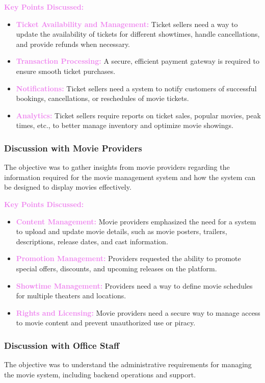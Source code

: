 \documentclass[a4paper,12pt]{article}  %
\renewcommand{\textbf}[1]{\textcolor{violet}{\bfseries #1}}
\begin{document}
\textbf{Key Points Discussed:}
\begin{itemize}
    \item \textbf{Ticket Availability and Management:} Ticket sellers need a way to update the availability of tickets for different showtimes, handle cancellations, and provide refunds when necessary.
    \item \textbf{Transaction Processing:} A secure, efficient payment gateway is required to ensure smooth ticket purchases.
    \item \textbf{Notifications:} Ticket sellers need a system to notify customers of successful bookings, cancellations, or reschedules of movie tickets.
    \item \textbf{Analytics:} Ticket sellers require reports on ticket sales, popular movies, peak times, etc., to better manage inventory and optimize movie showings.
\end{itemize}

\subsubsection*{Discussion with Movie Providers}
The objective was to gather insights from movie providers regarding the information required for the movie management system and how the system can be designed to display movies effectively.

\textbf{Key Points Discussed:}
\begin{itemize}
    \item \textbf{Content Management:} Movie providers emphasized the need for a system to upload and update movie details, such as movie posters, trailers, descriptions, release dates, and cast information.
    \item \textbf{Promotion Management:} Providers requested the ability to promote special offers, discounts, and upcoming releases on the platform.
    \item \textbf{Showtime Management:} Providers need a way to define movie schedules for multiple theaters and locations.
    \item \textbf{Rights and Licensing:} Movie providers need a secure way to manage access to movie content and prevent unauthorized use or piracy.
\end{itemize}

\subsubsection*{Discussion with Office Staff}
The objective was to understand the administrative requirements for managing the movie system, including backend operations and support.
\end{document}
